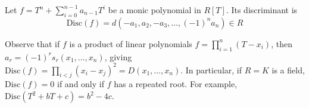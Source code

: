\begin{definition}
	Let \( f = T^n + \sum_{i=0}^{n-1} a_{n-1} T^i \) be a monic polynomial in \( R[T] \).
	Its discriminant is
	\[ \mathrm{Disc}(f) = d(-a_1, a_2, -a_3, \dots, (-1)^n a_n) \in R \]
\end{definition}
Observe that if \( f \) is a product of linear polynomials \( f = \prod_{i=1}^n (T - x_i) \), then \( a_r = (-1)^r s_r(x_1, \dots, x_n) \), giving \( \mathrm{Disc}(f) = \prod_{i < j} (x_i - x_j)^2 = D(x_1, \dots, x_n) \).
In particular, if \( R = K \) is a field, \( \mathrm{Disc}(f) = 0 \) if and only if \( f \) has a repeated root.
For example, \( \mathrm{Disc}(T^2 + bT + c) = b^2 - 4c \).
